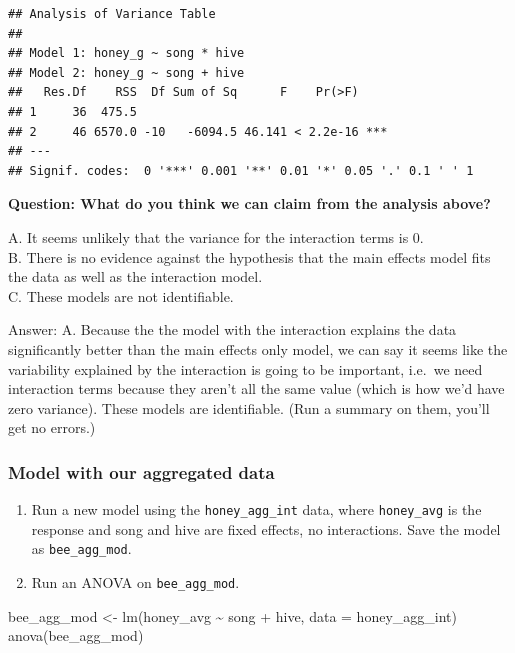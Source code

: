 \documentclass[
  openany]{book}
\newenvironment{Shaded}{\begin{snugshade}}{\end{snugshade}}
\newcommand{\AttributeTok}[1]{\textcolor[rgb]{0.77,0.63,0.00}{#1}}
\newcommand{\FunctionTok}[1]{\textcolor[rgb]{0.00,0.00,0.00}{#1}}
\newcommand{\NormalTok}[1]{#1}
\newcommand{\OtherTok}[1]{\textcolor[rgb]{0.56,0.35,0.01}{#1}}
\newcommand{\SpecialCharTok}[1]{\textcolor[rgb]{0.00,0.00,0.00}{#1}}
\providecommand{\tightlist}{%
  \setlength{\itemsep}{0pt}\setlength{\parskip}{0pt}}
\begin{document}
\begin{verbatim}
## Analysis of Variance Table
## 
## Model 1: honey_g ~ song * hive
## Model 2: honey_g ~ song + hive
##   Res.Df    RSS  Df Sum of Sq      F    Pr(>F)    
## 1     36  475.5                                   
## 2     46 6570.0 -10   -6094.5 46.141 < 2.2e-16 ***
## ---
## Signif. codes:  0 '***' 0.001 '**' 0.01 '*' 0.05 '.' 0.1 ' ' 1
\end{verbatim}

\textbf{Question: What do you think we can claim from the analysis above?}

A. It seems unlikely that the variance for the interaction terms is 0.\\
B. There is no evidence against the hypothesis that the main effects model fits the data as well as the interaction model.\\
C. These models are not identifiable.

Answer: A. Because the the model with the interaction explains the data significantly better than the main effects only model, we can say it seems like the variability explained by the interaction is going to be important, i.e.~we need interaction terms because they aren't all the same value (which is how we'd have zero variance). These models are identifiable. (Run a summary on them, you'll get no errors.)

\hypertarget{model-with-our-aggregated-data}{%
\subsubsection{Model with our aggregated data}\label{model-with-our-aggregated-data}}

\begin{enumerate}
\def\labelenumi{\arabic{enumi}.}
\tightlist
\item
  Run a new model using the \texttt{honey\_agg\_int} data, where \texttt{honey\_avg} is the response and song and hive are fixed effects, no interactions. Save the model as \texttt{bee\_agg\_mod}.
\item
  Run an ANOVA on \texttt{bee\_agg\_mod}.
\end{enumerate}

\begin{Shaded}
\begin{Highlighting}[]
\NormalTok{bee\_agg\_mod }\OtherTok{\textless{}{-}} \FunctionTok{lm}\NormalTok{(honey\_avg }\SpecialCharTok{\textasciitilde{}}\NormalTok{ song }\SpecialCharTok{+}\NormalTok{ hive, }\AttributeTok{data =}\NormalTok{ honey\_agg\_int)}
\FunctionTok{anova}\NormalTok{(bee\_agg\_mod)}
\end{Highlighting}
\end{Shaded}
\end{document}
